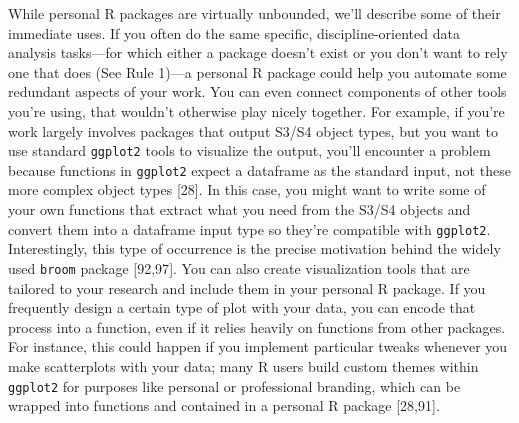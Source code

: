\documentclass[10pt,letterpaper]{article}
\begin{document}
While personal R packages are virtually unbounded, we'll describe some
of their immediate uses. If you often do the same specific,
discipline-oriented data analysis tasks---for which either a package
doesn't exist or you don't want to rely one that does (See Rule 1)---a
personal R package could help you automate some redundant aspects of
your work. You can even connect components of other tools you're using,
that wouldn't otherwise play nicely together. For example, if you're
work largely involves packages that output S3/S4 object types, but you
want to use standard \texttt{ggplot2} tools to visualize the output,
you'll encounter a problem because functions in \texttt{ggplot2} expect
a dataframe as the standard input, not these more complex object types
{[}28{]}. In this case, you might want to write some of your own
functions that extract what you need from the S3/S4 objects and convert
them into a dataframe input type so they're compatible with
\texttt{ggplot2}. Interestingly, this type of occurrence is the precise
motivation behind the widely used \texttt{broom} package {[}92,97{]}.
You can also create visualization tools that are tailored to your
research and include them in your personal R package. If you frequently
design a certain type of plot with your data, you can encode that
process into a function, even if it relies heavily on functions from
other packages. For instance, this could happen if you implement
particular tweaks whenever you make scatterplots with your data; many R
users build custom themes within \texttt{ggplot2} for purposes like
personal or professional branding, which can be wrapped into functions
and contained in a personal R package {[}28,91{]}.
\end{document}

